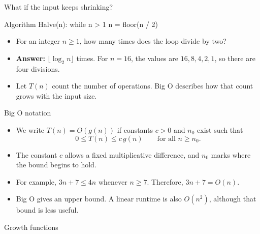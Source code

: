 \documentclass[aspectratio=169]{beamer}
\begin{document}
\begin{frame}[fragile]{What if the input keeps shrinking?}
\begin{pycode}
Algorithm Halve(n):
    while n > 1
        n = floor(n / 2)
\end{pycode}
\begin{itemize}
\item For an integer $n\geq1$, how many times does the loop divide by two?
\pause
\item \textbf{Answer:} $\lfloor\log_2 n\rfloor$ times. For $n=16$, the values are $16,8,4,2,1$, so there are four divisions.
\pause
\item Let $T(n)$ count the number of operations. Big O describes how that count grows with the input size.
\end{itemize}
\end{frame}

\begin{frame}{Big O notation}
\begin{itemize}
\item We write $T(n)=O(g(n))$ if constants $c>0$ and $n_0$ exist such that
\[0\leq T(n)\leq c\,g(n)\qquad\text{for all }n\geq n_0.\]
\pause
\item The constant $c$ allows a fixed multiplicative difference, and $n_0$ marks where the bound begins to hold.
\pause
\item For example, $3n+7\leq4n$ whenever $n\geq7$. Therefore, $3n+7=O(n)$.
\pause
\item Big O gives an upper bound. A linear runtime is also $O(n^2)$, although that bound is less useful.
\end{itemize}
\end{frame}

\begin{frame}{Growth functions}
\centering
{}
\end{frame}
\end{document}
